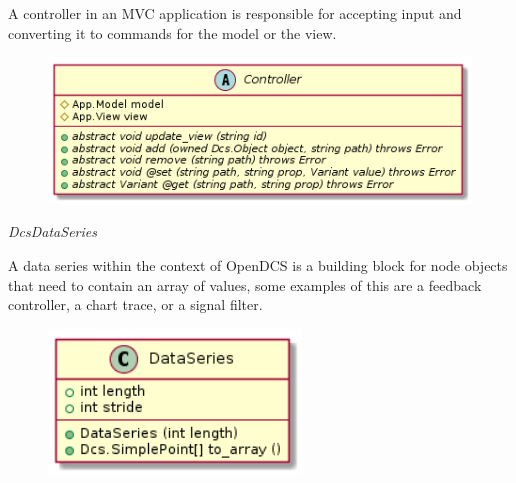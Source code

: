       \vspace*{-0.75cm}
      \begin{minipage}[t]{0.5\textwidth}
        \vspace*{0.5cm}
        A controller in an MVC application is responsible for accepting input
        and converting it to commands for the model or the view.
      \end{minipage} \hfill
      \begin{minipage}[t]{0.45\textwidth}
        \begin{figure}[H]
          \includegraphics[width=\textwidth]{figures/design/class/core/controller}
          \label{fig:dsg-classes-controller}
        \end{figure}
      \end{minipage}

      \emph{DcsDataSeries}

      \vspace*{-0.75cm}
      \begin{minipage}[t]{0.5\textwidth}
        \vspace*{0.5cm}
        A data series within the context of OpenDCS is a building block for
        node objects that need to contain an array of values, some examples of
        this are a feedback controller, a chart trace, or a signal filter.
      \end{minipage} \hfill
      \begin{minipage}[t]{0.45\textwidth}
        \begin{figure}[H]
          \includegraphics[width=0.6\textwidth]{figures/design/class/core/dataseries}
          \label{fig:dsg-classes-data-series}
        \end{figure}
      \end{minipage}

